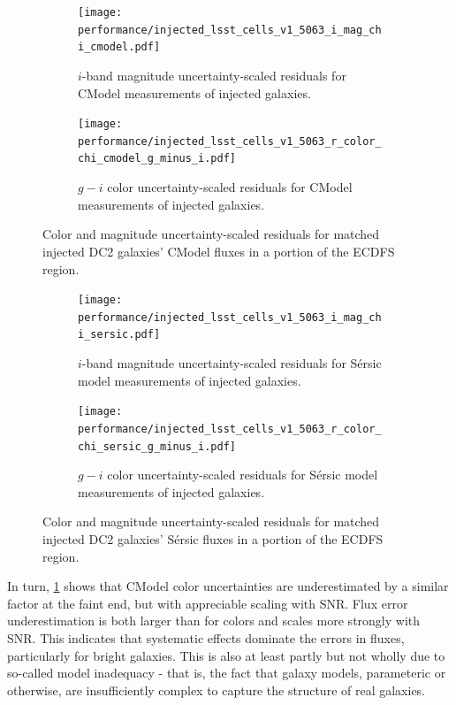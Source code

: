 \begin{figure}[hbt!]
  \centering
  \begin{subfigure}[t]{0.45\textwidth}
  \texttt{[image: performance/injected\_lsst\_cells\_v1\_5063\_i\_mag\_chi\_cmodel.pdf]}
  \caption{$i$-band magnitude uncertainty-scaled residuals for CModel measurements of injected galaxies.}
  \end{subfigure}\hfill
  \begin{subfigure}[t]{0.45\textwidth}
  \texttt{[image: performance/injected\_lsst\_cells\_v1\_5063\_r\_color\_chi\_cmodel\_g\_minus\_i.pdf]}
  \caption{$g-i$ color uncertainty-scaled residuals for CModel measurements of injected galaxies.}
  \end{subfigure}\hfill
\caption{Color and magnitude uncertainty-scaled residuals for matched injected DC2 galaxies' CModel fluxes in a portion of the \gls{ECDFS} region.}
\label{fig:injected_lsst_cells_v1_5063_galaxy_cmodel_chi}
\vspace{0.1cm}
\end{figure}

\begin{figure}[hbt!]
  \centering
  \begin{subfigure}[t]{0.45\textwidth}
  \texttt{[image: performance/injected\_lsst\_cells\_v1\_5063\_i\_mag\_chi\_sersic.pdf]}
  \caption{$i$-band magnitude uncertainty-scaled residuals for S\'ersic model measurements of injected galaxies.}
  \end{subfigure}\hfill
  \begin{subfigure}[t]{0.45\textwidth}
  \texttt{[image: performance/injected\_lsst\_cells\_v1\_5063\_r\_color\_chi\_sersic\_g\_minus\_i.pdf]}
  \caption{$g-i$ color uncertainty-scaled residuals for S\'ersic model measurements of injected galaxies.}
  \end{subfigure}\hfill
\caption{Color and magnitude uncertainty-scaled residuals for matched injected DC2 galaxies' S\'ersic fluxes in a portion of the \gls{ECDFS} region.}
\label{fig:injected_lsst_cells_v1_5063_galaxy_sersic_chi}
\vspace{0.1cm}
\end{figure}

In turn, \ref{fig:injected_lsst_cells_v1_5063_galaxy_cmodel_chi} shows that CModel color uncertainties are underestimated by a similar factor at the faint end, but with appreciable scaling with \gls{SNR}.
Flux error underestimation is both larger than for colors and scales more strongly with \gls{SNR}.
This indicates that systematic effects dominate the errors in fluxes, particularly for bright galaxies.
This is also at least partly but not wholly due to so-called model inadequacy - that is, the fact that galaxy models, parameteric or otherwise, are insufficiently complex to capture the structure of real galaxies.

